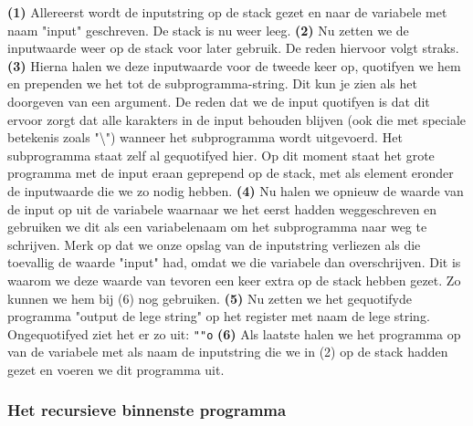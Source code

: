 \textbf{(1)} Allereerst wordt de inputstring op de stack gezet en naar de variabele met naam "input" geschreven. De stack is nu weer leeg. \textbf{(2)} Nu zetten we de inputwaarde weer op de stack voor later gebruik. De reden hiervoor volgt straks.
\textbf{(3)} Hierna halen we deze inputwaarde voor de tweede keer op, quotifyen we hem en prependen we het tot de subprogramma-string. Dit kun je zien als het doorgeven van een argument. De reden dat we de input quotifyen is dat dit ervoor zorgt dat alle karakters in de input behouden blijven (ook die met speciale betekenis zoals "\textbackslash{}") wanneer het subprogramma wordt uitgevoerd. Het subprogramma staat zelf al gequotifyed hier.
Op dit moment staat het grote programma met de input eraan geprepend op de stack, met als element eronder de inputwaarde die we zo nodig hebben. \textbf{(4)} Nu halen we opnieuw de waarde van de input op uit de variabele waarnaar we het eerst hadden weggeschreven en gebruiken we dit als een variabelenaam om het subprogramma naar weg te schrijven. Merk op dat we onze opslag van de inputstring verliezen als die toevallig de waarde "input" had, omdat we die variabele dan overschrijven. Dit is waarom we deze waarde van tevoren een keer extra op de stack hebben gezet. Zo kunnen we hem bij (6) nog gebruiken. \textbf{(5)} Nu zetten we het gequotifyde programma "output de lege string" op het register met naam de lege string. Ongequotifyed ziet het er zo uit: \texttt{""o}
\textbf{(6)} Als laatste halen we het programma op van de variabele met als naam de inputstring die we in (2) op de stack hadden gezet en voeren we dit programma uit.

\subsubsection{Het recursieve binnenste programma}




